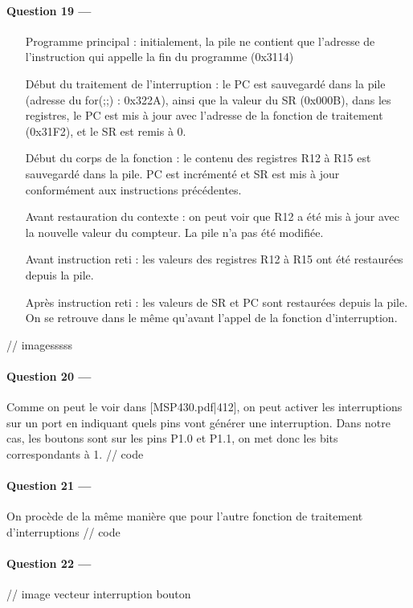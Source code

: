\documentclass[a4paper,11pt,article]{memoir}
\begin{document}
\paragraph{Question 19 ---}  

\begin{itemize}
	\item[Programme principal :] initialement, la pile ne contient que l'adresse de l'instruction qui appelle la fin du programme (0x3114)
	\item[Début du traitement de l'interruption :] le PC est sauvegardé dans la pile (adresse du for(;;) : 0x322A), ainsi que la valeur du SR (0x000B), dans les registres, le PC est mis à jour avec l'adresse de la fonction de traitement (0x31F2), et le SR est remis à 0.
	\item[Début du corps de la fonction :] le contenu des registres R12 à R15 est sauvegardé dans la pile. PC est incrémenté et SR est mis à jour conformément aux instructions précédentes.
	\item[Avant restauration du contexte :] on peut voir que R12 a été mis à jour avec la nouvelle valeur du compteur. La pile n'a pas été modifiée.
	\item[Avant instruction reti :] les valeurs des registres R12 à R15 ont été restaurées depuis la pile.
	\item[Après instruction reti :] les valeurs de SR et PC sont restaurées depuis la pile. On se retrouve dans le même qu'avant l'appel de la fonction d'interruption.
\end{itemize}
// imagesssss

\paragraph{Question 20 ---}  Comme on peut le voir dans [MSP430.pdf|412], on peut activer les interruptions sur un port en indiquant quels pins vont générer une interruption. Dans notre cas, les boutons sont sur les pins P1.0 et P1.1, on met donc les bits correspondants à 1.
// code

\paragraph{Question 21 ---}  On procède de la même manière que pour l'autre fonction de traitement d'interruptions
// code

\paragraph{Question 22 ---}  // image vecteur interruption bouton
\end{document}
